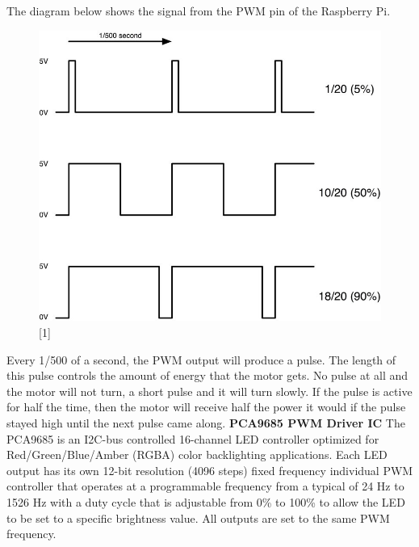 \documentclass[11pt,a4paper]{article}
\begin{document}
	 The diagram below shows the signal from the PWM pin of the Raspberry Pi. 
	  \begin{figure}[h!]
	  	\includegraphics[scale=2.0]{pwmwaves.jpg}
	  	\centering
	  	\caption{[1]}
	  \end{figure}
	  \vspace{5mm}
	  \newline
	  Every 1/500 of a second, the PWM output will produce a pulse. The length of this pulse controls the amount of energy that the motor gets. No pulse at all and the motor will not turn, a short pulse and it will turn slowly. If the pulse is active for half the time, then the motor will receive half the power it would if the pulse stayed high until the next pulse came along.
	  \vspace{5mm}
	  \newline
	  \textbf{PCA9685 PWM Driver IC}
	   \vspace{5mm}
	  \newline
	 The PCA9685 is an I2C-bus controlled 16-channel LED controller optimized for Red/Green/Blue/Amber (RGBA) color backlighting applications. Each LED output has its own 12-bit resolution (4096 steps) fixed frequency individual PWM controller that operates at a programmable frequency from a typical of 24 Hz to 1526 Hz with a duty cycle that is
	 adjustable from  0\% to 100\% to allow the LED to be set to a specific brightness value.
	 All outputs are set to the same PWM frequency.
	 
\end{document}
